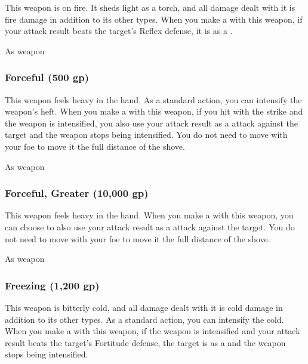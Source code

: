 This weapon is on fire.
It sheds light as a torch, and all damage dealt with it is fire damage in addition to its other types.
When you make a  with this weapon, if your attack result beats the target's Reflex defense, it is  as a .



 


 As weapon


\lowercase{\hypertarget{item:Forceful}{}}\label{item:Forceful}
\hypertarget{item:Forceful}{\subsubsection{Forceful\hfill{} (500 gp)}}

This weapon feels heavy in the hand.
As a standard action, you can intensify the weapon's heft.
When you make a  with this weapon, if you hit with the strike and the weapon is intensified,
you also use your attack result as a  attack against the target and the weapon stops being intensified.
You do not need to move with your foe to move it the full distance of the shove.



 As weapon


\lowercase{\hypertarget{item:Forceful, Greater}{}}\label{item:Forceful, Greater}
\hypertarget{item:Forceful, Greater}{\subsubsection{Forceful, Greater\hfill{} (10,000 gp)}}

This weapon feels heavy in the hand.
When you make a  with this weapon, you can choose to also use your attack result as a  attack against the target.
You do not need to move with your foe to move it the full distance of the shove.



 As weapon


\lowercase{\hypertarget{item:Freezing}{}}\label{item:Freezing}
\hypertarget{item:Freezing}{\subsubsection{Freezing\hfill{} (1,200 gp)}}

This weapon is bitterly cold, and all damage dealt with it is cold damage in addition to its other types.
As a standard action, you can intensify the cold.
When you make a  with this weapon, if the weapon is intensified and your attack result beats the target's Fortitude defense,
the target is \fatigued as a  and the weapon stops being intensified.



